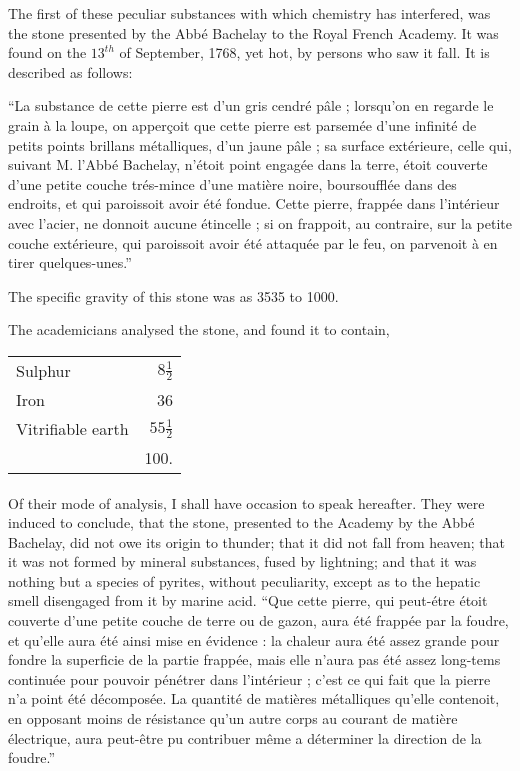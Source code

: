 \documentclass[a4paper, 12pt, oneside]{article}
\begin{document}
The first of these peculiar substances with which chemistry has interfered, was the stone presented by the Abbé Bachelay to the Royal French Academy. It was found on the $13^{th}$ of September, 1768, yet hot, by persons who saw it fall. It is described as follows:

``La substance de cette pierre est d'un gris cendré pâle ; lorsqu'on en regarde le grain à la loupe, on apperçoit que cette pierre est parsemée d'une infinité de petits points brillans métalliques, d'un jaune pâle ; sa surface extérieure, celle qui, suivant M. l'Abbé Bachelay, n'étoit point engagée dans la terre, étoit couverte d'une petite couche trés-mince d'une matière noire, boursoufflée dans des endroits, et qui paroissoit avoir été fondue. Cette pierre, frappée dans l'intérieur avec l'acier, ne donnoit aucune étincelle ; si on frappoit, au contraire, sur la petite couche extérieure, qui paroissoit avoir été attaquée par le feu, on parvenoit à en tirer quelques-unes.''

The specific gravity of this stone was as 3535 to 1000.

The academicians analysed the stone, and found it to contain,
\begin{table}[H]
    \centering
    \begin{tabular}{l r}
        Sulphur & $8\frac{1}{2}$ \\ 
        Iron & 36 \\
        Vitrifiable earth & $55\frac{1}{2}$ \\ \hline
        ~ & 100. \\
    \end{tabular}
\end{table}
\paragraph{}
Of their mode of analysis, I shall have occasion to speak hereafter. They were induced to conclude, that the stone, presented to the Academy by the Abbé Bachelay, did not owe its origin to thunder; that it did not fall from heaven; that it was not formed by mineral substances, fused by lightning; and that it was nothing but a species of pyrites, without peculiarity, except as to the hepatic smell disengaged from it by marine acid. ``Que cette pierre, qui peut-étre étoit couverte d'une petite couche de terre ou de gazon, aura été frappée par la foudre, et qu'elle aura été ainsi mise en évidence : la chaleur aura été assez grande pour fondre la superficie de la partie frappée, mais elle n'aura pas été assez long-tems continuée pour pouvoir pénétrer dans l'intérieur ; c'est ce qui fait que la pierre n'a point été décomposée. La quantité de matières métalliques qu'elle contenoit, en opposant moins de résistance qu'un autre corps au courant de matière électrique, aura peut-être pu contribuer même a déterminer la direction de la foudre.''
\end{document}
